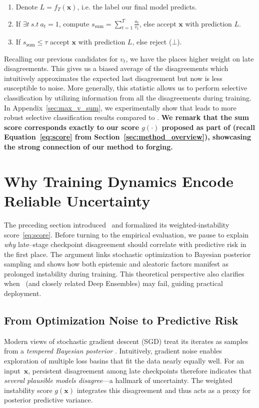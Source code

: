 \begin{enumerate}
     \item Denote $L = f_T(\bm{x})$, i.e. the label our final model predicts.
     \item If $\exists t~s.t~a_t =1$, compute $s_\text{sum} = \sum_{t=1}^T \frac{a_t}{v_t} $, else accept $\bm{x}$ with prediction $L$. 
     \item If $s_\text{sum} \leq \tau$ accept $\bm{x}$ with prediction $L$, else reject ($\bot$).
\end{enumerate}

Recalling our previous candidates for $v_t$, we have the \ssum places higher weight on late disagreements. This gives us a biased average of the disagreements which intuitively approximates the expected last disagreement but now is less susceptible to noise. More generally, this statistic allows us to perform selective classification by utilizing information from all the disagreements during training. In Appendix~\ref{sec:max_v_sum}, we experimentally show that \ssum leads to more robust selective classification results compared to \smax. \textbf{We remark that the sum score \ssum corresponds exactly to our score $g(\cdot)$ proposed as part of \sptd (recall Equation~\ref{eq:score} from Section~\ref{sec:method_overview}), showcasing the strong connection of our method to forging.}


\section{Why Training Dynamics Encode Reliable Uncertainty}
\label{sec:sptd_theory}
 
The preceding section introduced \sptd\ and formalized its weighted‐instability score~\eqref{eq:score}. Before turning to the empirical evaluation, we pause to explain \emph{why} late–stage checkpoint disagreement should correlate with predictive risk in the first place.  
The argument links stochastic optimization to Bayesian posterior sampling and shows how both epistemic and aleatoric factors manifest as prolonged instability during training.  
This theoretical perspective also clarifies when \sptd\ (and closely related Deep Ensembles) may fail, guiding practical deployment.

\subsection{From Optimization Noise to Predictive Risk}

Modern views of stochastic gradient descent (SGD) treat its iterates as samples from a \emph{tempered Bayesian posterior} \citep{mandt2017stochastic,zhang2019cyclical}.  
Intuitively, gradient noise enables exploration of multiple loss basins that fit the data nearly equally well.  
For an input~$\bm{x}$, persistent disagreement among late checkpoints therefore indicates that \emph{several plausible models disagree}—a hallmark of uncertainty.  
The weighted instability score $g(\bm{x})$ integrates this disagreement and thus acts as a proxy for posterior predictive variance.

